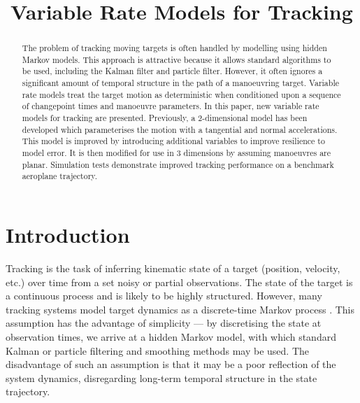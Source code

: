 \documentclass[conference]{IEEEtran}
\begin{document}
\title{Variable Rate Models for Tracking}

\author{
}

\maketitle



\begin{abstract}

The problem of tracking moving targets is often handled by modelling using hidden Markov models. This approach is attractive because it allows standard algorithms to be used, including the Kalman filter and particle filter. However, it often ignores a significant amount of temporal structure in the path of a manoeuvring target. Variable rate models treat the target motion as deterministic when conditioned upon a sequence of changepoint times and manoeuvre parameters. In this paper, new variable rate models for tracking are presented. Previously, a 2-dimensional model has been developed which parameterises the motion with a tangential and normal accelerations. This model is improved by introducing additional variables to improve resilience to model error. It is then modified for use in 3 dimensions by assuming manoeuvres are planar. Simulation tests demonstrate improved tracking performance on a benchmark aeroplane trajectory.

\end{abstract}



\section{Introduction}

Tracking is the task of inferring kinematic state of a target (position, velocity, etc.) over time from a set noisy or partial observations. The state of the target is a continuous process and is likely to be highly structured. However, many tracking systems model target dynamics as a discrete-time Markov process \cite{Li2003}. This assumption has the advantage of simplicity --- by discretising the state at observation times, we arrive at a hidden Markov model, with which standard Kalman \cite{Anderson1979} or particle \cite{Cappe2007,Doucet2009} filtering and smoothing methods may be used. The disadvantage of such an assumption is that it may be a poor reflection of the system dynamics, disregarding long-term temporal structure in the state trajectory.
\end{document}

